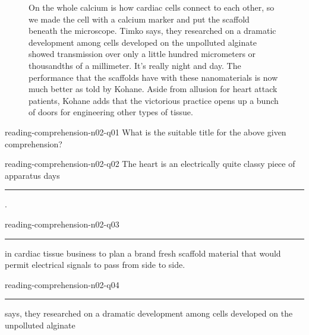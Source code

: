 {\begin{figure}[p]
    On the whole calcium is how cardiac cells connect to each other, so we made the cell with a calcium marker and put the scaffold beneath the microscope. 
    Timko says, they researched on a dramatic development among cells developed on the unpolluted alginate showed transmission over only a little hundred micrometers or thousandths of a millimeter. 
    It's really night and day. 
    The performance that the scaffolds have with these nanomaterials is now much better as told by Kohane. 
    Aside from allusion for heart attack patients, Kohane adds that the victorious practice opens up a bunch of doors for engineering other types of tissue.
\end{figure}


\begin{question}{reading-comprehension-n02-q01}
    What is the suitable title for the above given comprehension?
    \begin{choices}[o]
    \end{choices}
\end{question}

\begin{question}{reading-comprehension-n02-q02}
    The heart is an electrically quite classy piece of apparatus days \rule[-0.1pt]{4em}{0.1pt}.
    \begin{choices}[o]
    \end{choices}
\end{question}

\begin{question}{reading-comprehension-n02-q03}
    \rule[-0.1pt]{4em}{0.1pt} in cardiac tissue business to plan a brand fresh scaffold material that would permit electrical signals to pass from side to side.
    \begin{choices}[o]
    \end{choices}
\end{question}

\begin{question}{reading-comprehension-n02-q04}
    \rule[-0.1pt]{4em}{0.1pt} says, they researched on a dramatic development among cells developed on the unpolluted alginate
    \begin{choices}[o]
    \end{choices}
\end{question}

}
